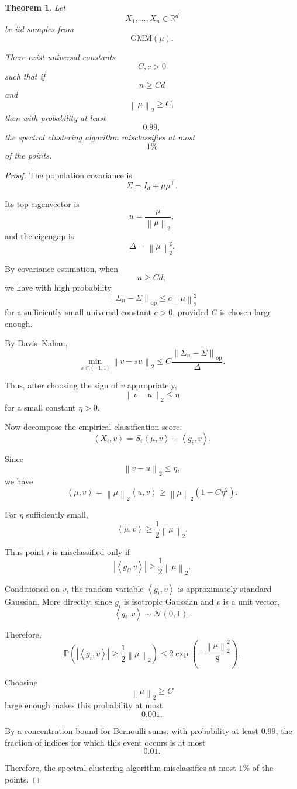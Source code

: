 \documentclass[12pt,oneside]{book}
\numberwithin{equation}{section}
\theoremstyle{definition}
\theoremstyle{plain}
\newtheorem{theorem}{Theorem}[section]
\theoremstyle{remark}
\newcommand{\R}{\mathbb{R}}
\newcommand{\Prob}{\mathbb{P}}
\newcommand{\norm}[1]{\left\lVert #1 \right\rVert}
\newcommand{\inner}[2]{\left\langle #1, #2 \right\rangle}
\newcommand{\Normal}{\mathcal{N}}
\begin{document}
\begin{theorem}
Let
\[
X_1,\dots,X_n\in\R^d
\]
be iid samples from
\[
\mathrm{GMM}(\mu).
\]

There exist universal constants
\[
C,c>0
\]
such that if
\[
n\geq Cd
\]
and
\[
\norm{\mu}_2\geq C,
\]
then with probability at least
\[
0.99,
\]
the spectral clustering algorithm misclassifies at most
\[
1\%
\]
of the points.
\end{theorem}

\begin{proof}
The population covariance is
\[
\Sigma=I_d+\mu\mu^\top.
\]

Its top eigenvector is
\[
u=\frac{\mu}{\norm{\mu}_2},
\]
and the eigengap is
\[
\Delta=\norm{\mu}_2^2.
\]

By covariance estimation, when
\[
n\geq Cd,
\]
we have with high probability
\[
\norm{\Sigma_n-\Sigma}_{\mathrm{op}}
\leq
c\norm{\mu}_2^2
\]
for a sufficiently small universal constant $c>0$, provided $C$ is chosen large enough.

By Davis--Kahan,
\[
\min_{s\in\{-1,1\}}
\norm{v-su}_2
\leq
C\frac{\norm{\Sigma_n-\Sigma}_{\mathrm{op}}}{\Delta}.
\]

Thus, after choosing the sign of $v$ appropriately,
\[
\norm{v-u}_2
\leq
\eta
\]
for a small constant $\eta>0$.

Now decompose the empirical classification score:
\[
\inner{X_i}{v}
=
S_i\inner{\mu}{v}
+
\inner{g_i}{v}.
\]

Since
\[
\norm{v-u}_2\leq \eta,
\]
we have
\[
\inner{\mu}{v}
=
\norm{\mu}_2\inner{u}{v}
\geq
\norm{\mu}_2(1-C\eta^2).
\]

For $\eta$ sufficiently small,
\[
\inner{\mu}{v}
\geq
\frac{1}{2}\norm{\mu}_2.
\]

Thus point $i$ is misclassified only if
\[
|\inner{g_i}{v}|
\geq
\frac{1}{2}\norm{\mu}_2.
\]

Conditioned on $v$, the random variable $\inner{g_i}{v}$ is approximately standard Gaussian. More directly, since $g_i$ is isotropic Gaussian and $v$ is a unit vector,
\[
\inner{g_i}{v}\sim \Normal(0,1).
\]

Therefore,
\[
\Prob\left(
|\inner{g_i}{v}|
\geq
\frac{1}{2}\norm{\mu}_2
\right)
\leq
2\exp\left(
-\frac{\norm{\mu}_2^2}{8}
\right).
\]

Choosing
\[
\norm{\mu}_2\geq C
\]
large enough makes this probability at most
\[
0.001.
\]

By a concentration bound for Bernoulli sums, with probability at least $0.99$, the fraction of indices for which this event occurs is at most
\[
0.01.
\]

Therefore, the spectral clustering algorithm misclassifies at most $1\%$ of the points.
\end{proof}
\end{document}
